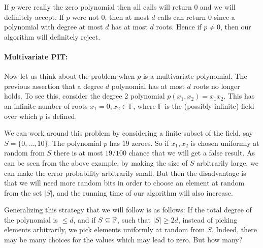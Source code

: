 If $p$ were really the zero polynomial then all calls will return 0 and we will definitely accept. If $p$ were not 
0, then at most $d$ calls can return 0 since a polynomial with degree at most $d$ has at most $d$ 
roots. Hence if $p \neq 0$, then our algorithm will definitely reject.

\paragraph{Multivariate PIT:}
Now let us think about the problem when $p$ is a multivariate
polynomial. The previous assertion that a degree $d$ polynomial has at
most $d$ roots no longer holds. To see this, consider the degree 2
polynomial $p(x_1, x_2) = x_1 x_2$. This has an infinite number of
roots $x_1 = 0, x_2 \in \mathbb{F}$, where $\mathbb{F}$ is the
(possibly infinite) field over which $p$ is defined. 

We can work around this problem by considering a finite subset of the field, say
$S = \{ 0, \ldots ,10 \}$. The polynomial $p$ has $19$ zeroes. So if
$x_1, x_2$ is chosen uniformly at random from $S$ there is at most
$19/100$ chance that we will get a false result. As can be seen from
the above example, by making the size of $S$ arbitrarily large, we can
make the error probability arbitrarily small. But then the
disadvantage is that we will need more random bits in order to choose
an element at random from the set $|S|$, and the running time of our
algorithm will also increase.

Generalizing this strategy that we will follow is as follows: If the total degree of
the polynomial is $\leq d$, and if $S \subseteq {\mathbb{F}}$, such that
$|S|\geq 2d$, instead of picking elements arbitrarily, we pick
elements uniformly at random from $S$. Indeed, there may be many
choices for the values which may lead to zero. But how many?


